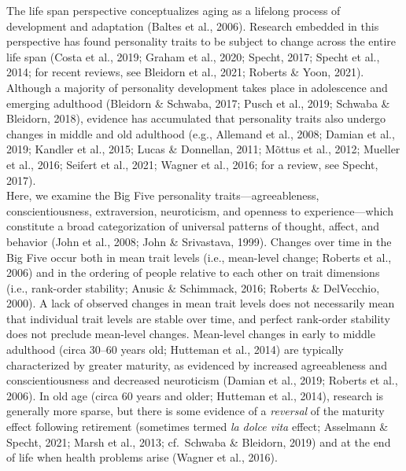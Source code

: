 \documentclass[
  english,
  man,floatsintext]{apa7}
\begin{document}
The life span perspective conceptualizes aging as a lifelong process of development and adaptation (Baltes et al., 2006). Research embedded in this perspective has found personality traits to be subject to change across the entire life span (Costa et al., 2019; Graham et al., 2020; Specht, 2017; Specht et al., 2014; for recent reviews, see Bleidorn et al., 2021; Roberts \& Yoon, 2021). Although a majority of personality development takes place in adolescence and emerging adulthood (Bleidorn \& Schwaba, 2017; Pusch et al., 2019; Schwaba \& Bleidorn, 2018), evidence has accumulated that personality traits also undergo changes in middle and old adulthood (e.g., Allemand et al., 2008; Damian et al., 2019; Kandler et al., 2015; Lucas \& Donnellan, 2011; Mõttus et al., 2012; Mueller et al., 2016; Seifert et al., 2021; Wagner et al., 2016; for a review, see Specht, 2017).\\
Here, we examine the Big Five personality traits---agreeableness, conscientiousness, extraversion, neuroticism, and openness to experience---which constitute a broad categorization of universal patterns of thought, affect, and behavior (John et al., 2008; John \& Srivastava, 1999). Changes over time in the Big Five occur both in mean trait levels (i.e., mean-level change; Roberts et al., 2006) and in the ordering of people relative to each other on trait dimensions (i.e., rank-order stability; Anusic \& Schimmack, 2016; Roberts \& DelVecchio, 2000). A lack of observed changes in mean trait levels does not necessarily mean that individual trait levels are stable over time, and perfect rank-order stability does not preclude mean-level changes. Mean-level changes in early to middle adulthood (circa 30--60 years old; Hutteman et al., 2014) are typically characterized by greater maturity, as evidenced by increased agreeableness and conscientiousness and decreased neuroticism (Damian et al., 2019; Roberts et al., 2006). In old age (circa 60 years and older; Hutteman et al., 2014), research is generally more sparse, but there is some evidence of a \emph{reversal} of the maturity effect following retirement (sometimes termed \emph{la dolce vita} effect; Asselmann \& Specht, 2021; Marsh et al., 2013; cf.~Schwaba \& Bleidorn, 2019) and at the end of life when health problems arise (Wagner et al., 2016).\\
\end{document}

